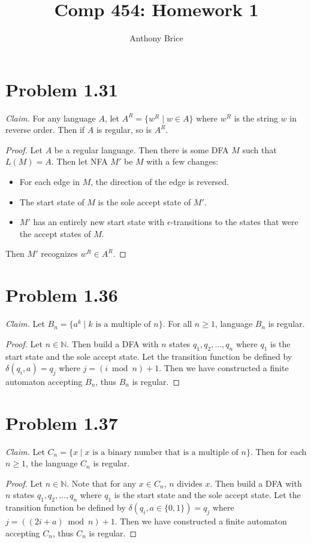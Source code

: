 \documentclass{abrice}
\author{Anthony Brice}
\title{Comp 454: Homework 1}
\newcommand{\N}{\mathbb{N}}
\begin{document}
\maketitle

\section{Problem 1.31}
\textit{Claim.} For any language $A$, let $A^R = \{ w^R \mid w \in A \}$ where
$w^R$ is the string $w$ in reverse order. Then if
$A$ is regular, so is $A^R$.

\begin{proof}
  Let $A$ be a regular language. Then there is some DFA $M$ such that $L(M) =
  A$. Then let NFA $M'$ be $M$ with a few changes:
  \begin{itemize}
  \item For each edge in $M$, the direction of the edge is reversed.
  \item The start state of $M$ is the sole accept state of $M'$.
  \item $M'$ has an entirely new start state with $\epsilon$-transitions to the
    states that were the accept states of $M$.
  \end{itemize}
  Then $M'$ recognizes $w^R \in A^R$.
\end{proof}

\section{Problem 1.36}
\textit{Claim.} Let $B_n = \{ a^k \mid k \text{ is a multiple of } n \}$. For
all $n \geq 1$, language $B_n$ is regular.

\begin{proof}
  Let $n \in \N$. Then build a DFA with $n$ states $q_1, q_2, \ldots, q_n$ where
  $q_1$ is the start state and the sole accept state. Let the transition
  function be defined by $\delta(q_i, a) = q_j$ where $j = (i \bmod n) + 1$.
  Then we have constructed a finite automaton accepting $B_n$, thus $B_n$ is
  regular.
\end{proof}

\section{Problem 1.37}
\textit{Claim.} Let $C_n = \{x \mid x \text{ is a binary number that is a
  multiple of } n \}$. Then for each $n \geq 1$, the language $C_n$ is regular.

\begin{proof}
  Let $n \in \N$. Note that for any $x \in C_n$, $n$ divides $x$. Then build a
  DFA with $n$ states $q_1, q_2, \ldots, q_n$ where $q_1$ is the start state and
  the sole accept state. Let the transition function be defined by $\delta(q_i,
  a \in \{0,1\}) = q_j$ where $j = ((2i + a) \bmod n) + 1$. Then we have
  constructed a finite automaton accepting $C_n$, thus $C_n$ is regular.
\end{proof}
\end{document}
